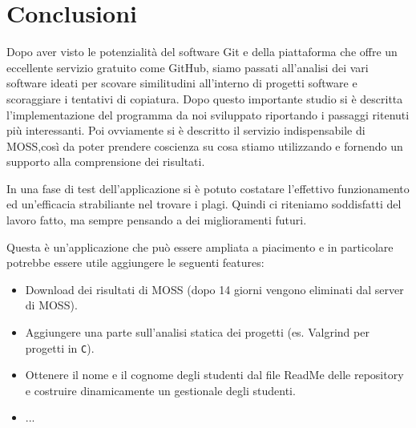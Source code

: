 \chapter{Conclusioni}
	Dopo aver visto le potenzialità del software Git e della piattaforma che offre un eccellente servizio gratuito come GitHub, siamo passati all'analisi dei vari software ideati per scovare similitudini all'interno di progetti software e scoraggiare i tentativi di copiatura.
	Dopo questo importante studio si è descritta l'implementazione del programma da noi sviluppato riportando i passaggi ritenuti più interessanti. Poi ovviamente si è descritto il servizio indispensabile di MOSS,così da poter prendere coscienza su cosa stiamo utilizzando e fornendo un supporto alla comprensione dei risultati.
	
	In una fase di test dell'applicazione si è potuto costatare l'effettivo funzionamento ed un'efficacia strabiliante nel trovare i plagi. Quindi ci riteniamo soddisfatti del lavoro fatto, ma sempre pensando a dei miglioramenti futuri.
	
	Questa è un'applicazione che può essere ampliata a piacimento e in particolare potrebbe essere utile aggiungere le seguenti features:
	\begin{itemize}
		\item Download dei risultati di MOSS (dopo 14 giorni vengono eliminati dal server di MOSS).
		\item Aggiungere una parte sull'analisi statica dei progetti (es. Valgrind per progetti in \verb|C|).
		\item Ottenere il nome e il cognome degli studenti dal file ReadMe delle repository e costruire dinamicamente un gestionale degli studenti.
		\item ...
	\end{itemize}